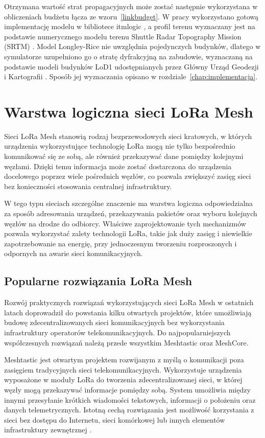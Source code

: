 \documentclass[12pt,a4paper,twoside]{report}
\theoremstyle{definition} %
\begin{document}
Otrzymana wartość strat propagacyjnych może zostać następnie wykorzystana w obliczeniach budżetu łącza ze wzoru~\eqref{linkbudget}. W pracy wykorzystano gotową implementację modelu w bibliotece itmlogic \cite{oughton2020}, a profil terenu wyznaczany jest na podstawie numerycznego modelu terenu Shuttle Radar Topography Mission (SRTM) \cite{farr2007}. Model Longley-Rice nie uwzględnia pojedynczych budynków, dlatego w symulatorze uzupełniono go o stratę dyfrakcyjną na zabudowie, wyznaczaną na podstawie modeli budynków LoD1 udostępnianych przez Główny Urząd Geodezji i Kartografii \cite{gugik_lod1}. Sposób jej wyznaczania opisano w rozdziale~\ref{chap:implementacja}.

\cleardoublepage
\chapter{Warstwa logiczna sieci LoRa Mesh}
    Sieci LoRa Mesh stanowią rodzaj bezprzewodowych sieci kratowych, w których urządzenia wykorzystujące technologię LoRa mogą nie tylko bezpośrednio komunikować się ze sobą, ale również przekazywać dane pomiędzy kolejnymi węzłami. Dzięki temu informacja może zostać dostarczona do urządzenia docelowego poprzez wiele pośrednich węzłów, co pozwala zwiększyć zasięg sieci bez konieczności stosowania centralnej infrastruktury.

    W tego typu sieciach szczególne znaczenie ma warstwa logiczna odpowiedzialna za sposób adresowania urządzeń, przekazywania pakietów oraz wyboru kolejnych węzłów na drodze do odbiorcy. Właściwe zaprojektowanie tych mechanizmów pozwala wykorzystać zalety technologii LoRa, takie jak duży zasięg i niewielkie zapotrzebowanie na energię, przy jednoczesnym tworzeniu rozproszonych i odpornych na awarie sieci komunikacyjnych.
    
    \section{Popularne rozwiązania LoRa Mesh}
    Rozwój praktycznych rozwiązań wykorzystujących sieci LoRa Mesh w ostatnich latach doprowadził do powstania kilku otwartych projektów, które umożliwiają budowę zdecentralizowanych sieci komunikacyjnych bez wykorzystania infrastruktury operatorów telekomunikacyjnych. Do najpopularniejszych współczesnych rozwiązań należą przede wszystkim Meshtastic oraz MeshCore.
    
    Meshtastic jest otwartym projektem rozwijanym z myślą o komunikacji poza zasięgiem tradycyjnych sieci telekomunikacyjnych. Wykorzystuje urządzenia wyposażone w moduły LoRa do tworzenia zdecentralizowanej sieci, w której węzły mogą przekazywać informacje pomiędzy sobą. System umożliwia między innymi przesyłanie krótkich wiadomości tekstowych, informacji o położeniu oraz danych telemetrycznych. Istotną cechą rozwiązania jest możliwość korzystania z sieci bez dostępu do Internetu, sieci komórkowej lub innych elementów infrastruktury zewnętrznej \cite{meshtastic_intro}.
    
\end{document}

